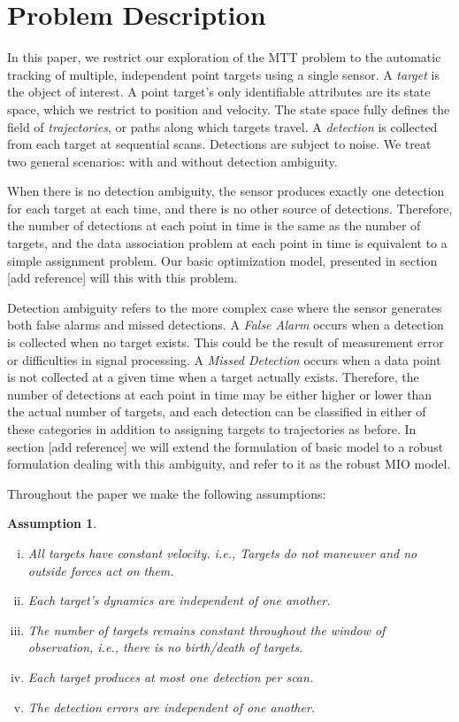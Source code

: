 \documentclass[journal]{IEEEtran}
\newtheorem{assumption}{Assumption}
\begin{document}
\section{Problem Description}\label{sec:Prob Description}
In this paper, we restrict our exploration of the MTT problem to the automatic tracking of multiple, independent point targets using a single sensor. A \textit{target} is the object of interest. A point target's only identifiable attributes are its state space, which we restrict to position and velocity. The state space fully defines the field of \textit{trajectories}, or paths along which targets travel. A \textit{detection} is collected from each target at sequential scans. Detections are subject to noise. We treat two general scenarios: with and without detection ambiguity. 

When there is no detection ambiguity, the sensor produces exactly one detection for each target at each time, and there is no other source of detections. Therefore, the number of detections at each point in time is the same as the number of targets, and the data association problem at each point in time is equivalent to a simple assignment problem. Our basic optimization model, presented in section [add reference] will this with this problem. 

Detection ambiguity refers to the more complex case where the sensor generates both false alarms and missed detections. A \textit{False Alarm} occurs when a detection is collected when no target exists. This could be the result of measurement error or difficulties in signal processing. A \textit{Missed Detection} occurs when a data point is not collected at a given time when a target actually exists. Therefore, the number of detections at each point in time may be either higher or lower than the actual number of targets, and each detection can be classified in either of these categories in addition to assigning targets to trajectories as before. In section [add reference] we will extend the formulation of basic model to a robust formulation dealing with this ambiguity, and refer to it as the robust MIO model.

Throughout the paper we make the following assumptions:
\begin{assumption}\label{ass:general_assumption}
\begin{enumerate}[(i)]
\item{}All targets have constant velocity. \textit{i.e.}, Targets do not maneuver and no outside forces act on them.
\item Each target's dynamics are independent of one another.
\item The number of targets remains constant throughout the window of observation, \textit{i.e.}, there is no birth/death of targets.
\item Each target produces at most one detection per scan.
\item The detection errors are independent of one another.
\end{enumerate}
\end{assumption}
\end{document}
